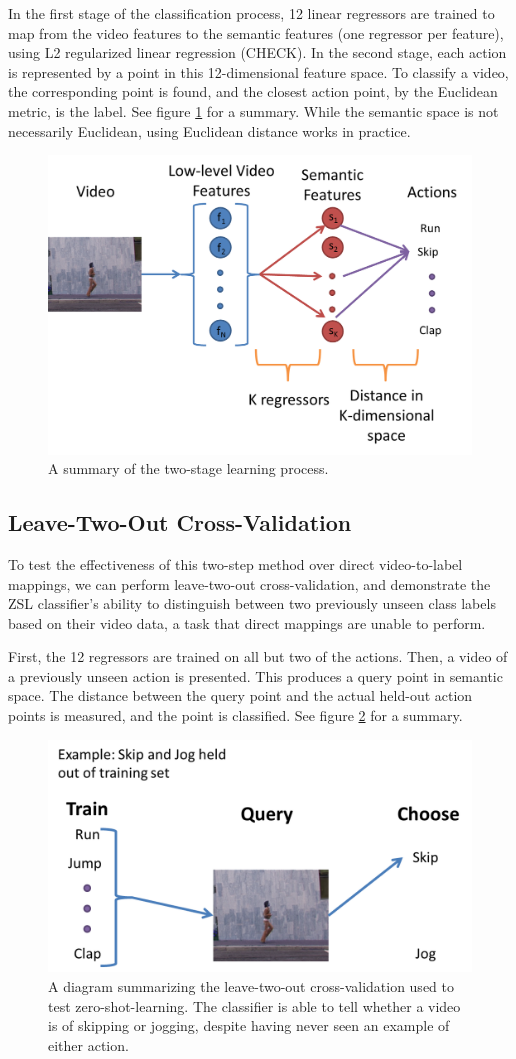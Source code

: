 \documentclass{article}
\begin{document}
In the first stage of the classification process, 12 linear regressors are trained to map from the video features to the semantic features (one regressor per feature), using L2 regularized linear regression (CHECK). In the second stage, each action is represented by a point in this 12-dimensional feature space. To classify a video, the corresponding point is found, and the closest action point, by the Euclidean metric, is the label. See figure \ref{2stage} for a summary. While the semantic space is not necessarily Euclidean, using Euclidean distance works in practice.

\begin{figure}[h]
  \centering
  \includegraphics[width=.4\linewidth]{2stagelearning.png}
  \caption{A summary of the two-stage learning process.}
  \label{2stage}
\end{figure}

\subsection{Leave-Two-Out Cross-Validation}
To test the effectiveness of this two-step method over direct video-to-label mappings, we can perform leave-two-out cross-validation, and demonstrate the ZSL classifier’s ability to distinguish between two previously unseen class labels based on their video data, a task that direct mappings are unable to perform.

First, the 12 regressors are trained on all but two of the actions. Then, a video of a previously unseen action is presented. This produces a query point in semantic space. The distance between the query point and the actual held-out action points is measured, and the point is classified. See figure \ref{ltocv} for a summary.

\begin{figure}[h]
  \centering
  \includegraphics[width = .4\linewidth]{ltocv}
  \caption{A diagram summarizing the leave-two-out cross-validation used to test zero-shot-learning. The classifier is able to tell whether a video is of skipping or jogging, despite having never seen an example of either action.}
  \label{ltocv}
\end{figure}
\end{document}
